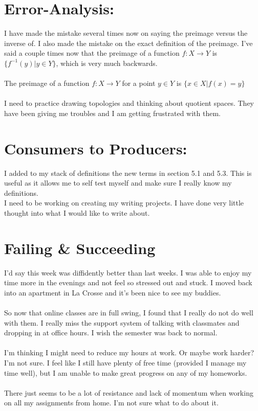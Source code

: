 \documentclass[11pt]{article}
\begin{document}
\section*{Error-Analysis:}
I have made the mistake several times now on saying the preimage versus the inverse of. I also made the mistake on the exact definition of the preimage. I've said a couple times now that the preimage of a function $f:X\to Y$ is $\{f^{-1}(y)|y\in Y\}$, which is very much backwards. \\
\\
The preimage of a function $f:X\to Y$ for a point $ y\in Y $ is $ \{x\in X|f(x)=y\} $\\
\\
I need to practice drawing topologies and thinking about quotient spaces. They have been giving me troubles and I am getting frustrated with them.
\section*{Consumers to Producers:}
I added to my stack of definitions the new terms in section 5.1 and 5.3. This is useful as it allows me to self test myself and make sure I really know my definitions.\\
I need to be working on creating my writing projects. I have done very little thought into what I would like to write about.

\section*{Failing \& Succeeding}
I'd say this week was diffidently better than last weeks. I was able to enjoy my time more in the evenings and not feel so stressed out and stuck. I moved back into an apartment in La Crosse and it's been nice to see my buddies.\\
\\
So now that online classes are in full swing, I found that I really do not do well with them. I really miss the support system of talking with classmates and dropping in at office hours. I wish the semester was back to normal. \\
\\
I'm thinking I might need to reduce my hours at work. Or maybe work harder? I'm not sure. I feel like I still have plenty of free time (provided I manage my time well), but I am unable to make great progress on any of my homeworks. \\
\\
There just seems to be a lot of resistance and lack of momentum when working on all my assignments from home. I'm not sure what to do about it.\\
\end{document}
